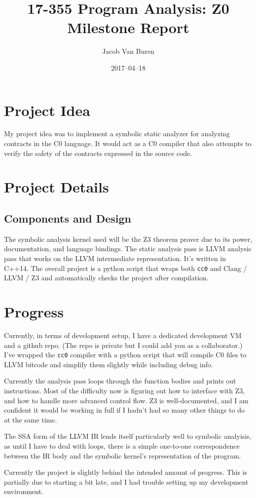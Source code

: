 \documentclass[12pt]{article}
\title{17-355 Program Analysis: Z0 Milestone Report}
\author{Jacob Van Buren}
\date{2017--04--18}
\begin{document}
\maketitle

\section{Project Idea}
My project idea was to implement a symbolic static analyzer for analyzing contracts in the C0 language.
It would act as a C0 compiler that also attempts to verify the safety of the contracts expressed in the source code.



\section{Project Details}
\subsection{Components and Design}
The symbolic analysis kernel used will be the Z3 theorem prover due to its power, documentation, and language bindings.
The static analysis pass is LLVM analysis pass that works on the LLVM intermediate representation. It's written in C++14.
The overall project is a python script that wraps both \texttt{cc0} and Clang / LLVM / Z3 and automatically checks the project after compilation.
\section{Progress}
Currently, in terms of development setup, I have a dedicated development VM and a github repo. (The repo is private but I could add you as a collaborator.)
I've wrapped the \texttt{cc0} compiler with a python script that will compile C0 files to LLVM bitcode and simplify them slightly while including debug info.

Currently the analysis pass loops through the function bodies and prints out instructions. Most of the difficulty now is figuring out how to interface with Z3, and how to handle more advanced control flow. Z3 is well-documented, and I am confident it would be working in full if I hadn't had so many other things to do at the same time.

The SSA form of the LLVM IR lends itself particularly well to symbolic analyisis, as until I have to deal with loops, there is a simple one-to-one correspondence between the IR body and the symbolic kernel's representation of the program.

Currently the project is slightly behind the intended amount of progress. This is partially due to starting a bit late, and I had trouble setting up my development environment.
\end{document}

